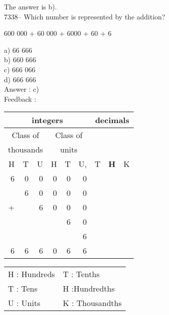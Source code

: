 \documentclass[letterpaper, 12pt]{article}
\begin{document}
\normalsize

The answer is b).\\


7338-- Which number is represented by the addition?\\
\begin{center}
600 000 + 60 000 + 6000 + 60 + 6
\end{center}

a) 66 666\\
b) 660 666\\
c) 666 066\\
d) 666 666\\

Answer : c)\\

Feedback :\\
\begin{center}
\begin{tabular}{|rrr|rrr|rrr|}
\hline
\multicolumn{6}{|c|}{integers} &\multicolumn{3}{|c|}{decimals} \\
\hline
\multicolumn{3}{|c|}{Class of} &\multicolumn{3}{|c|}{Class of} &  \multicolumn{3}{c|}{} \\
\multicolumn{3}{|c|}{thousands} &\multicolumn{3}{|c|}{units} &  \multicolumn{3}{c|}{} \\
\hline
H & T & U &H & T & U, & T\up{th} & \textbf{H\up{th}} & K\up{th} \\
\hline
\hline
6 & 0 & 0 & 0 & 0 & 0 & & &\\
  & 6 & 0 & 0 & 0 & 0 & & &\\
+ &   & 6 & 0 & 0 & 0 & & &\\
  &   &   &   & 6 & 0 & & &\\
  &  &    &   &   & 6 & & &\\
\hline
\hline
6 & 6 & 6 & 0 & 6 & 6 & & &\\
\hline
\end{tabular}
\end{center}

\scriptsize
\begin{center}
\begin{tabular}{ll}
H : Hundreds & T\up{th} : Tenths\\
T : Tens & H\up{th} :Hundredths\\
U : Units & K\up{e} : Thousandths\\
\end{tabular}
\end{center}

\normalsize
\end{document}
